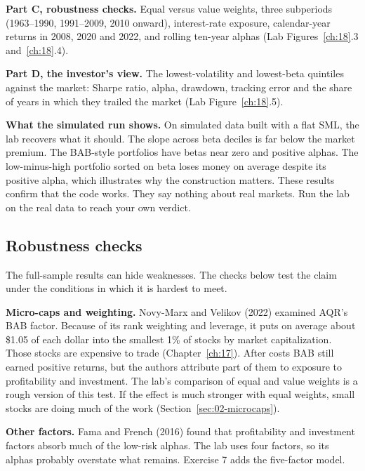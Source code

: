 \textbf{Part C, robustness checks.} Equal versus value weights, three subperiods (1963--1990, 1991--2009, 2010 onward), interest-rate exposure, calendar-year returns in 2008, 2020 and 2022, and rolling ten-year alphas (Lab Figures~\ref{ch:18}.3 and~\ref{ch:18}.4).

\textbf{Part D, the investor's view.} The lowest-volatility and lowest-beta quintiles against the market: Sharpe ratio, alpha, drawdown, tracking error and the share of years in which they trailed the market (Lab Figure~\ref{ch:18}.5).

\textbf{What the simulated run shows.} On simulated data built with a flat SML, the lab recovers what it should. The slope across beta deciles is far below the market premium. The BAB-style portfolios have betas near zero and positive alphas. The low-minus-high portfolio sorted on beta loses money on average despite its positive alpha, which illustrates why the construction matters. These results confirm that the code works. They say nothing about real markets. Run the lab on the real data to reach your own verdict.

\subsection{Robustness checks}
\label{sec:18-stress}

The full-sample results can hide weaknesses. The checks below test the claim under the conditions in which it is hardest to meet.

\textbf{Micro-caps and weighting.} Novy-Marx and Velikov (2022) examined AQR's BAB factor. Because of its rank weighting and leverage, it puts on average about \$1.05 of each dollar into the smallest 1\% of stocks by market capitalization. Those stocks are expensive to trade (Chapter~\ref{ch:17}). After costs BAB still earned positive returns, but the authors attribute part of them to exposure to profitability and investment. The lab's comparison of equal and value weights is a rough version of this test. If the effect is much stronger with equal weights, small stocks are doing much of the work (Section~\ref{sec:02-microcaps}).

\textbf{Other factors.} Fama and French (2016) found that profitability and investment factors absorb much of the low-risk alphas. The lab uses four factors, so its alphas probably overstate what remains. Exercise 7 adds the five-factor model.

